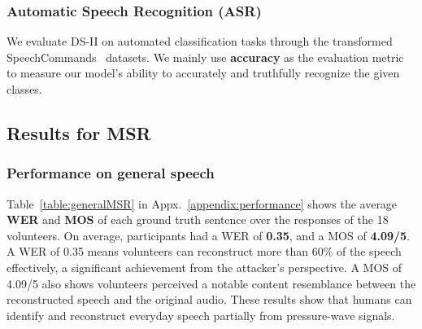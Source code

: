 \subsubsection{\textbf{Automatic Speech Recognition (ASR)}}
{
We evaluate DS-II on automated classification tasks through the transformed SpeechCommands~\cite{speechcommandsv2} datasets. 
We mainly use \textbf{accuracy} as the evaluation metric to measure our model's ability to accurately and truthfully recognize the given classes. 


\subsection{Results for MSR}
\label{subsec:MSRevaluation}

\subsubsection{\textbf{Performance on general speech}}
Table~\ref{table:generalMSR} in Appx.~\ref{appendix:performance} shows the average \textbf{WER} and \textbf{MOS} of each ground truth sentence over the responses of the 18 volunteers. 
On average, participants had a WER of \textbf{0.35}, and a MOS of \textbf{4.09/5}. A WER of 0.35 means volunteers can reconstruct more than 60\% of the speech effectively, a significant achievement from the attacker's perspective. 
A MOS of 4.09/5 also shows volunteers perceived a notable content resemblance between the reconstructed speech and the original audio. 
These results show that humans can identify and reconstruct everyday speech partially from pressure-wave signals. 



}
